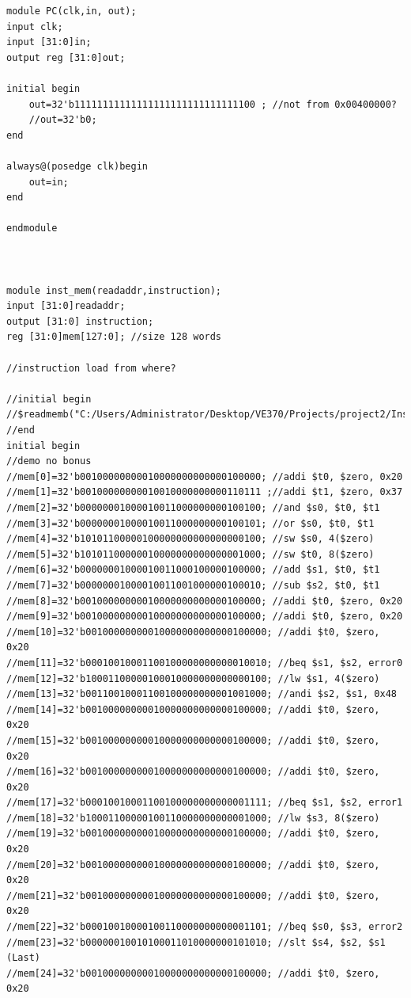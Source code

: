 \documentclass[a4paper,12pt]{article}
\begin{document}
\begin{lstlisting}
module PC(clk,in, out);
input clk;
input [31:0]in;
output reg [31:0]out;

initial begin
    out=32'b11111111111111111111111111111100 ; //not from 0x00400000?
    //out=32'b0;
end

always@(posedge clk)begin
    out=in;
end

endmodule 



module inst_mem(readaddr,instruction);
input [31:0]readaddr;
output [31:0] instruction;
reg [31:0]mem[127:0]; //size 128 words

//instruction load from where?

//initial begin
//$readmemb("C:/Users/Administrator/Desktop/VE370/Projects/project2/InstructionMem_for_P2_Demo.txt",mem);
//end
initial begin
//demo no bonus
//mem[0]=32'b00100000000010000000000000100000; //addi $t0, $zero, 0x20
//mem[1]=32'b00100000000010010000000000110111 ;//addi $t1, $zero, 0x37
//mem[2]=32'b00000001000010011000000000100100; //and $s0, $t0, $t1
//mem[3]=32'b00000001000010011000000000100101; //or $s0, $t0, $t1
//mem[4]=32'b10101100000100000000000000000100; //sw $s0, 4($zero)
//mem[5]=32'b10101100000010000000000000001000; //sw $t0, 8($zero)
//mem[6]=32'b00000001000010011000100000100000; //add $s1, $t0, $t1
//mem[7]=32'b00000001000010011001000000100010; //sub $s2, $t0, $t1
//mem[8]=32'b00100000000010000000000000100000; //addi $t0, $zero, 0x20
//mem[9]=32'b00100000000010000000000000100000; //addi $t0, $zero, 0x20
//mem[10]=32'b00100000000010000000000000100000; //addi $t0, $zero, 0x20
//mem[11]=32'b00010010001100100000000000010010; //beq $s1, $s2, error0
//mem[12]=32'b10001100000100010000000000000100; //lw $s1, 4($zero)
//mem[13]=32'b00110010001100100000000001001000; //andi $s2, $s1, 0x48
//mem[14]=32'b00100000000010000000000000100000; //addi $t0, $zero, 0x20
//mem[15]=32'b00100000000010000000000000100000; //addi $t0, $zero, 0x20
//mem[16]=32'b00100000000010000000000000100000; //addi $t0, $zero, 0x20
//mem[17]=32'b00010010001100100000000000001111; //beq $s1, $s2, error1
//mem[18]=32'b10001100000100110000000000001000; //lw $s3, 8($zero)
//mem[19]=32'b00100000000010000000000000100000; //addi $t0, $zero, 0x20
//mem[20]=32'b00100000000010000000000000100000; //addi $t0, $zero, 0x20
//mem[21]=32'b00100000000010000000000000100000; //addi $t0, $zero, 0x20
//mem[22]=32'b00010010000100110000000000001101; //beq $s0, $s3, error2
//mem[23]=32'b00000010010100011010000000101010; //slt $s4, $s2, $s1 (Last)
//mem[24]=32'b00100000000010000000000000100000; //addi $t0, $zero, 0x20

\end{lstlisting}
\end{document}
